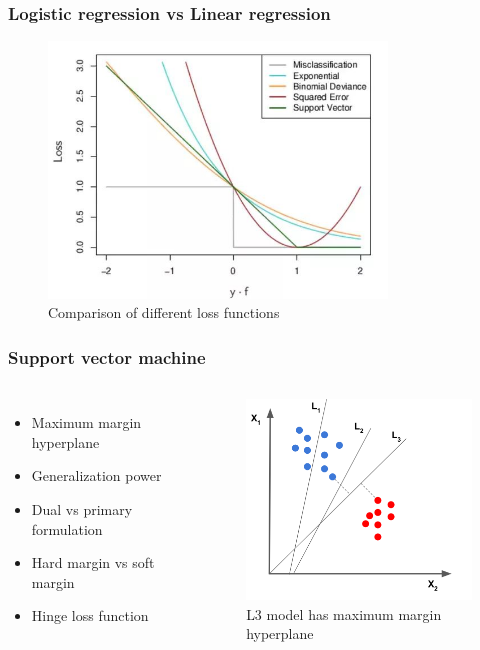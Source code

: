 \documentclass{beamer}
\begin{document}
\begin{frame}
	\frametitle{Logistic regression vs Linear regression}	
	\begin{figure}[h]
		\centering
		\includegraphics[width=9cm]{losses}
		\caption{Comparison of different loss functions}
	\end{figure}
	
\end{frame}

\begin{frame}
	\frametitle{Support vector machine}	
	\begin{columns}[c] %
		
		\begin{itemize}
			\item Maximum margin hyperplane
			\item Generalization power
			\item Dual vs primary formulation
			\item Hard margin vs soft margin
			\item Hinge loss function
		\end{itemize} 
				
		\begin{figure}[h]
			\includegraphics[width=6cm]{svm}
			\caption{L3 model has maximum margin hyperplane}
		\end{figure}
		
	\end{columns}	
\end{frame}
\end{document}
